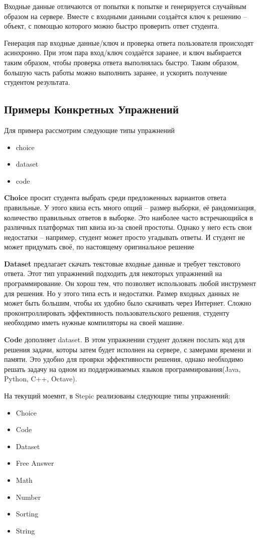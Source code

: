 \documentclass{matmex-diploma-custom}
\begin{document}
Входные данные отличаются от попытки к попытке и генерируется
случайным образом на сервере. Вместе с входными данными создаётся ключ
к решению -- объект, с помощью которого можно быстро проверить ответ
студента.

Генерация пар входные данные/ключ и проверка ответа пользователя
происходят асинхронно. При этом пара вход/ключ создаётся заранее, и
ключ выбирается таким образом, чтобы проверка ответа выполнялась
быстро. Таким образом, большую часть работы можно выполнить заранее,
и ускорить получение студентом результата.

\subsection*{Примеры Конкретных Упражнений}
Для примера рассмотрим следующие типы упражнений
\begin{itemize}
\item choice
\item dataset
\item code
\end{itemize}

\textbf{Choice} просит студента выбрать среди предложенных вариантов
ответа правильные. У этого квиза есть много опций -- размер выборки,
её рандомизация, количество правильных ответов в выборке. Это наиболее
часто встречающийся в различных платформах тип квиза из-за своей
простоты. Однако у него есть свои недостатки -- например, студент
может просто угадывать ответы. И студент не может придумать своё, по
настоящему оригинальное решение

\textbf{Dataset} предлагает скачать текстовые входные данные и требует
текстового ответа. Этот тип упражнений подходить для некоторых
упражнений на программирование. Он хорош тем, что позволяет
использовать любой инструмент для решения. Но у этого типа есть и
недостатки. Размер входных данных не может быть большим, чтобы их
удобно было скачивать через Интернет. Сложно проконтроллировать
эффективность пользовательского решения, студенту необходимо иметь
нужные компиляторы на своей машине.

\textbf{Code} дополняет dataset. В этом упражнении студент должен
послать код для решения задачи, которы затем будет исполнен на
сервере, с замерами времени и памяти. Это удобно для проврки
эффективности решения, однако необходимо решать задачу на одном из
поддерживаемых языков программирования(Java, Python, C++, Octave).

На текущий моемнт, в Stepic реализованы следующие типы упражнений:
\begin{itemize}
\item Choice
\item Code
\item Dataset
\item Free Answer
\item Math
\item Number
\item Sorting
\item String
\end{itemize}
\end{document}

